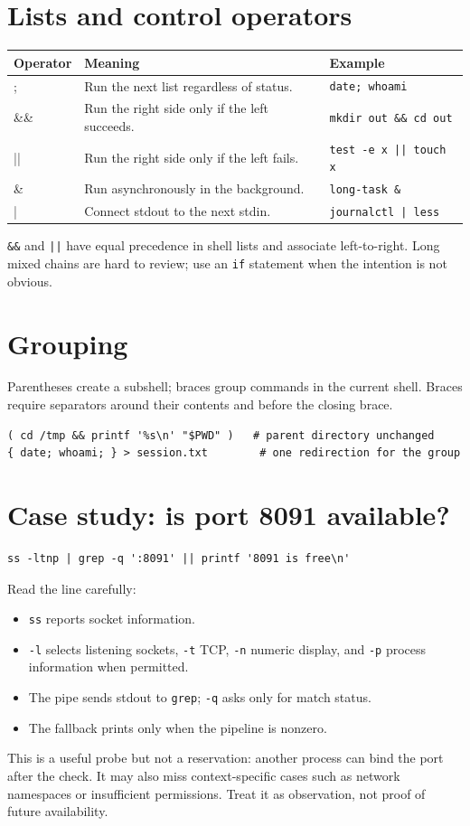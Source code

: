 \documentclass[11pt,oneside,openany]{book}
\begin{document}
\section{Lists and control operators}
\begin{center}
\begin{tabularx}{0.95\textwidth}{>{\ttfamily}p{}X p{}}
\toprule
Operator & Meaning & Example \\
\midrule
; & Run the next list regardless of status. & \texttt{date; whoami} \\
\&\& & Run the right side only if the left succeeds. & \texttt{mkdir out \&\& cd out} \\
|| & Run the right side only if the left fails. & \texttt{test -e x || touch x} \\
\& & Run asynchronously in the background. & \texttt{long-task \&} \\
| & Connect stdout to the next stdin. & \texttt{journalctl | less} \\
\bottomrule
\end{tabularx}
\end{center}
\texttt{\&\&} and \texttt{||} have equal precedence in shell lists and associate left-to-right. Long mixed chains are hard to review; use an \texttt{if} statement when the intention is not obvious.

\section{Grouping}
Parentheses create a subshell; braces group commands in the current shell. Braces require separators around their contents and before the closing brace.
\begin{lstlisting}
( cd /tmp && printf '%s\n' "$PWD" )   # parent directory unchanged
{ date; whoami; } > session.txt        # one redirection for the group
\end{lstlisting}

\section{Case study: is port 8091 available?}
\begin{lstlisting}
ss -ltnp | grep -q ':8091' || printf '8091 is free\n'
\end{lstlisting}
Read the line carefully:
\begin{itemize}
  \item \texttt{ss} reports socket information.
  \item \texttt{-l} selects listening sockets, \texttt{-t} TCP, \texttt{-n} numeric display, and \texttt{-p} process information when permitted.
  \item The pipe sends stdout to \texttt{grep}; \texttt{-q} asks only for match status.
  \item The fallback prints only when the pipeline is nonzero.
\end{itemize}
This is a useful probe but not a reservation: another process can bind the port after the check. It may also miss context-specific cases such as network namespaces or insufficient permissions. Treat it as observation, not proof of future availability.
\end{document}
